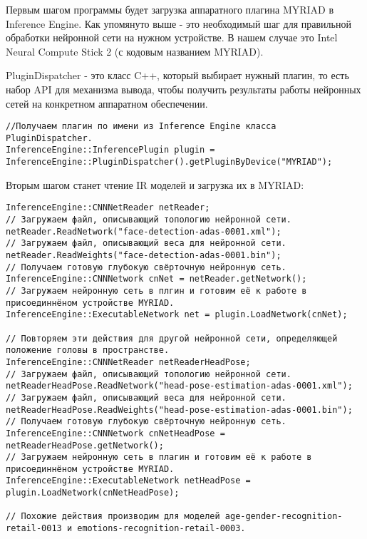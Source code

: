 \documentclass[12pt,a4paper]{scrartcl}
\begin{document}
			Первым шагом программы будет загрузка аппаратного плагина MYRIAD в Inference Engine. Как упомянуто выше - это необходимый шаг для правильной обработки нейронной сети на нужном устройстве. В нашем случае это Intel Neural Compute Stick 2 (с кодовым названием MYRIAD). 
			
			PluginDispatcher - это класс C++, который выбирает нужный плагин, то есть набор API для механизма вывода, чтобы
			получить результаты работы нейронных сетей на конкретном аппаратном обеспечении\cite{bib:Using_IE_API_Legacy}.
			
			\begin{verbatim}
//Получаем плагин по имени из Inference Engine класса PluginDispatcher.
InferenceEngine::InferencePlugin plugin = InferenceEngine::PluginDispatcher().getPluginByDevice("MYRIAD");
			\end{verbatim}
			
			Вторым шагом станет чтение IR моделей и загрузка их в MYRIAD:
			
			\begin{verbatim}
InferenceEngine::CNNNetReader netReader;
// Загружаем файл, описывающий топологию нейронной сети.
netReader.ReadNetwork("face-detection-adas-0001.xml");
// Загружаем файл, описывающий веса для нейронной сети.
netReader.ReadWeights("face-detection-adas-0001.bin");
// Получаем готовую глубокую свёрточную нейронную сеть.
InferenceEngine::CNNNetwork cnNet = netReader.getNetwork();
// Загружаем нейронную сеть в плгин и готовим её к работе в присоединнёном устройстве MYRIAD.
InferenceEngine::ExecutableNetwork net = plugin.LoadNetwork(cnNet);

// Повторяем эти действия для другой нейронной сети, определяющей положение головы в пространстве.
InferenceEngine::CNNNetReader netReaderHeadPose;
// Загружаем файл, описывающий топологию нейронной сети.
netReaderHeadPose.ReadNetwork("head-pose-estimation-adas-0001.xml");
// Загружаем файл, описывающий веса для нейронной сети.
netReaderHeadPose.ReadWeights("head-pose-estimation-adas-0001.bin");
// Получаем готовую глубокую свёрточную нейронную сеть.
InferenceEngine::CNNNetwork cnNetHeadPose = netReaderHeadPose.getNetwork();
// Загружаем нейронную сеть в плагин и готовим её к работе в присоединнёном устройстве MYRIAD.
InferenceEngine::ExecutableNetwork netHeadPose = plugin.LoadNetwork(cnNetHeadPose);

// Похожие действия производим для моделей age-gender-recognition-retail-0013 и emotions-recognition-retail-0003.	
			\end{verbatim}
			
\end{document}
